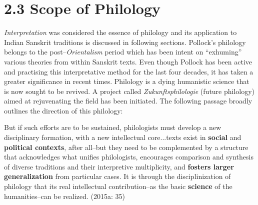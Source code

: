 \vspace{-.3cm}

\section*{2.3 Scope of Philology}

\textit{Interpretation} was considered the essence of philology and its application to Indian Sanskrit traditions is discussed in following sections. Pollock’s philology belongs to the post–\textit{Orientalism} period which has been intent on “exhuming” various theories from within Sanskrit texts. Even though Pollock has been active and practising this interpretative method for the last four decades, it has taken a greater significance in recent times. Philology is a dying humanistic science that is now sought to be revived. A project called \textit{Zukunftsphilologie} (future philology) aimed at rejuvenating the field has been initiated. The following passage broadly outlines the direction of this philology:

\begin{myquote}
But if such efforts are to be sustained, philologists must develop a new disciplinary formation, with a new intellectual core...texts exist in \textbf{social} and \textbf{political contexts}, after all–but they need to be complemented by a structure that acknowledges what unifies philologists, encourages comparison and synthesis of diverse traditions and their interpretive multiplicity, and \textbf{fosters larger generalization} from particular cases. It is through the disciplinization of philology that its real intellectual contribution–as the basic \textbf{science} of the humanities–can be realized. (2015a: 35)
\end{myquote}

